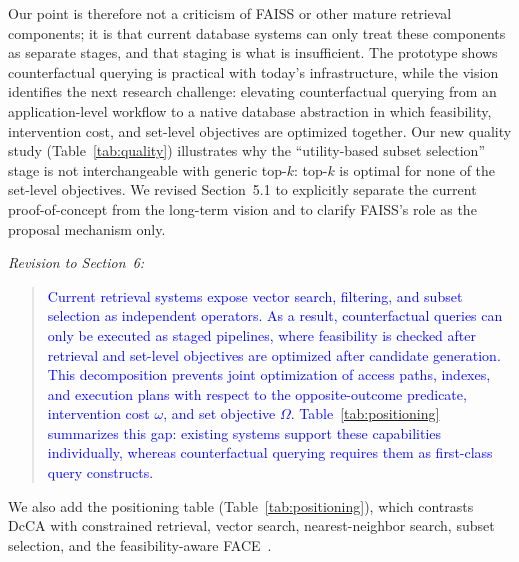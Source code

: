 Our point is therefore not a criticism of FAISS or other mature retrieval components; it is that current database systems can only treat these components as separate stages, and that staging is what is insufficient. The prototype shows counterfactual querying is practical with today's infrastructure, while the vision identifies the next research challenge: elevating counterfactual querying from an application-level workflow to a native database abstraction in which feasibility, intervention cost, and set-level objectives are optimized together. Our new quality study (Table~\ref{tab:quality}) illustrates why the ``utility-based subset selection'' stage is not interchangeable with generic top-$k$: top-$k$ is optimal for none of the set-level objectives. We revised Section~5.1 to explicitly separate the current proof-of-concept from the long-term vision and to clarify FAISS's role as the proposal mechanism only.

\noindent\emph{Revision to Section~6:}
\begin{quote}
\textcolor{blue}{Current retrieval systems expose vector search, filtering, and subset selection as independent operators. As a result, counterfactual queries can only be executed as staged pipelines, where feasibility is checked after retrieval and set-level objectives are optimized after candidate generation. This decomposition prevents joint optimization of access paths, indexes, and execution plans with respect to the opposite-outcome predicate, intervention cost $\omega$, and set objective $\Omega$. Table~\ref{tab:positioning} summarizes this gap: existing systems support these capabilities individually, whereas counterfactual querying requires them as first-class query constructs.}
\end{quote}
We also add the positioning table (Table~\ref{tab:positioning}), which contrasts DcCA with constrained retrieval, vector search, nearest-neighbor search, subset selection, and the feasibility-aware FACE~\cite{poyiadzi2020face}.
